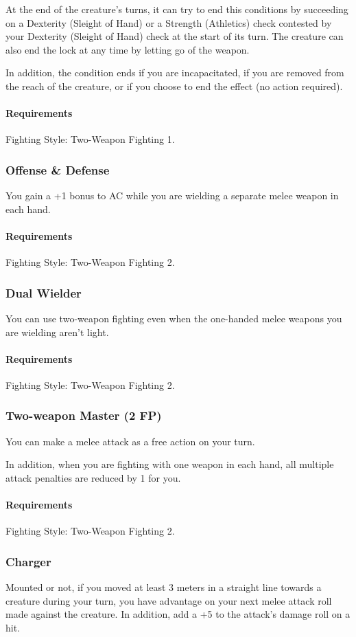     At the end of the creature's turns, it can try to end this conditions by succeeding on a Dexterity (Sleight of Hand) or a Strength (Athletics) check contested by your Dexterity (Sleight of Hand) check at the start of its turn.
    The creature can also end the lock at any time by letting go of the weapon.

    In addition, the condition ends if you are incapacitated, if you are removed from the reach of the creature, or if you choose to end the effect (no action required).
    \paragraph{Requirements} Fighting Style: Two-Weapon Fighting 1.
\subsubsection{Offense \& Defense} \label{feat::offenseanddefense}
    You gain a +1 bonus to AC while you are wielding a separate melee weapon in each hand.
    \paragraph{Requirements} Fighting Style: Two-Weapon Fighting 2.
\subsubsection{Dual Wielder} \label{feat::dualwielder}
    You can use two-weapon fighting even when the one-handed melee weapons you are wielding aren't light.
    \paragraph{Requirements} Fighting Style: Two-Weapon Fighting 2.
\subsubsection{Two-weapon Master (2 FP)} \label{feat::twoweaponmaster}
    You can make a melee attack as a free action on your turn.

    In addition, when you are fighting with one weapon in each hand, all multiple attack penalties are reduced by 1 for you.
    \paragraph{Requirements} Fighting Style: Two-Weapon Fighting 2.
\subsubsection{Charger} \label{feat::charger}
    Mounted or not, if you moved at least 3 meters in a straight line towards a creature during your turn, you have advantage on your next melee attack roll made against the creature.
    In addition, add a +5 to the attack's damage roll on a hit.
